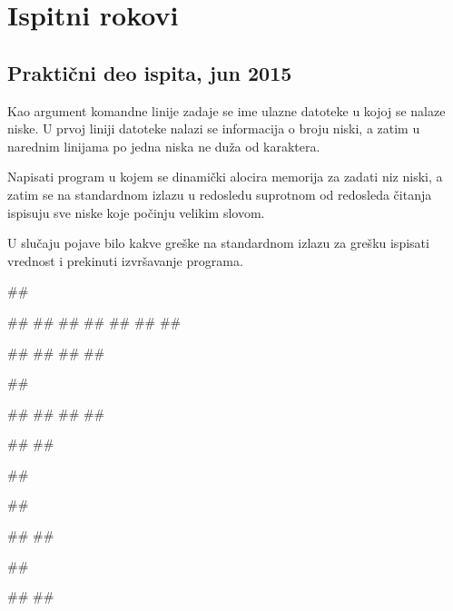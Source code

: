 \chapter{Ispitni rokovi}

\section{Praktični deo ispita, jun 2015}

\begin{Exercise}[label=5_01]
Kao argument komandne linije zadaje se ime ulazne datoteke u kojoj se nalaze niske. U prvoj liniji datoteke nalazi se informacija o broju niski, a zatim u narednim linijama po jedna niska ne duža od  karaktera.
  
Napisati program u kojem se dinamički alocira memorija za zadati niz niski, a zatim se na standardnom izlazu u redosledu suprotnom od redosleda čitanja ispisuju sve niske koje počinju velikim slovom. 

U slučaju pojave bilo kakve greške na standardnom izlazu za grešku ispisati vrednost  i prekinuti izvršavanje programa.

\begin{miditest}
\begin{test}{1}
##

##
##
##
##
##
##
##
  
#\naslovIzlaz#
##
##
##
\end{test}
\end{miditest}
\begin{minitest}
\begin{test}{2}
##

##
##
##
##

#\naslovIzlaz#
#\izlaz{}#
\end{test}
\end{minitest}


\begin{miditest}
\begin{test}{3}
##

##

#\naslovIzlaz#
##
\end{test}
\end{miditest}
\begin{miditest}
\begin{test}{4}
##

#\naslovIzlazZaGresku#
##
\end{test}
\end{miditest}

\end{Exercise}
\begin{Answer}[ref=5_01]
\end{Answer}


